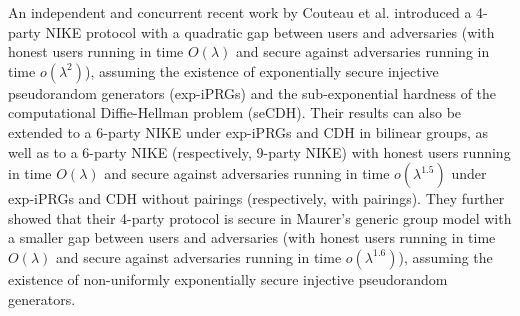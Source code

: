 An independent and concurrent recent work by Couteau et al. \cite{C:BauCouSad24} introduced a 4-party NIKE protocol with a quadratic gap between users and adversaries (with honest users running in time $O(\lambda)$ and secure against adversaries running in time $o(\lambda^{2})$), assuming the existence of exponentially secure injective pseudorandom generators (exp-iPRGs) and the sub-exponential hardness of the computational Diffie-Hellman problem (seCDH). Their results can also be extended to a 6-party NIKE under exp-iPRGs and CDH in bilinear groups, as well as to a 6-party NIKE (respectively, 9-party NIKE) with honest users running in time $O(\lambda)$ and secure against adversaries running in time  $o(\lambda^{1.5})$ under exp-iPRGs and CDH without pairings (respectively, with pairings). They further showed that their 4-party protocol is secure in Maurer's generic group model with a smaller gap between users and adversaries (with honest users running in time $O(\lambda)$ and secure against adversaries running in time $o(\lambda^{1.6})$), assuming the existence of non-uniformly exponentially secure injective pseudorandom generators.


